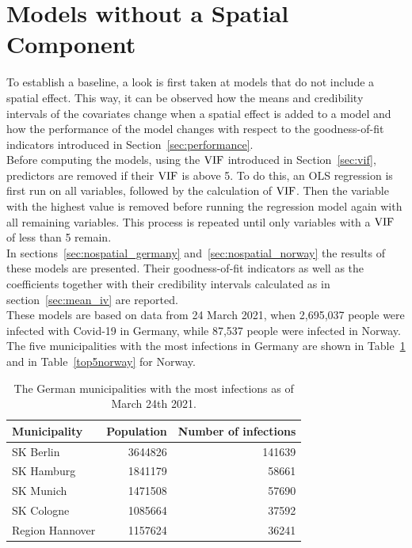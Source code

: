 \section{Models without a Spatial Component}\label{sec:nospatial}
To establish a baseline, a look is first taken at models that do not include a spatial effect. This way, it can be observed how the means and credibility intervals of the covariates change when a spatial effect is added to a model and how the performance of the model changes with respect to the goodness-of-fit indicators introduced in Section~\ref{sec:performance}. \\
Before computing the models, using the $\hbox{VIF}$ introduced in Section~\ref{sec:vif}, predictors are removed if their $\hbox{VIF}$ is above 5. To do this, an OLS regression is first run on all variables, followed by the calculation of $\hbox{VIF}$. Then the variable with the highest value is removed before running the regression model again with all remaining variables. This process is repeated until only variables with a $\hbox{VIF}$ of less than 5 remain. \\
In sections~\ref{sec:nospatial_germany} and~\ref{sec:nospatial_norway} the results of these models are presented. Their goodness-of-fit indicators as well as the coefficients together with their credibility intervals calculated as in section~\ref{sec:mean_iv} are reported. \\
These models are based on data from 24 March 2021, when 2,695,037 people were infected with Covid-19 in Germany, while 87,537 people were infected in Norway. The five municipalities with the most infections in Germany are shown in Table~\ref{top5germany} and in Table~\ref{top5norway} for Norway.
\begin{table}[H] 
\caption{The German municipalities with the most infections as of March 24th 2021. \label{top5germany}}
\begin{tabular}{l r r}
\toprule
\textbf{Municipality}	& \textbf{Population}	& \textbf{Number of infections} \\
\midrule
SK Berlin & 3644826 & 141639  \\   
SK Hamburg & 1841179 & 58661  \\
SK Munich & 1471508 & 57690  \\
SK Cologne & 1085664 & 37592  \\
Region Hannover & 1157624 & 36241  \\
\bottomrule
\end{tabular}
\end{table}
